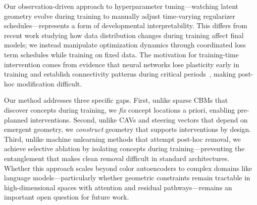 Our observation-driven approach to hyperparameter tuning---watching latent geometry evolve during training to manually adjust time-varying regularizer schedules---represents a form of developmental interpretability. This differs from recent work studying how data distribution changes during training affect final models; we instead manipulate optimization dynamics through coordinated loss term schedules while training on fixed data. The motivation for training-time intervention comes from evidence that neural networks lose plasticity early in training and establish connectivity patterns during critical periods~\citep{AchilleRS17}, making post-hoc modification difficult.

Our method addresses three specific gaps. First, unlike sparse CBMs that discover concepts during training, we \textit{fix} concept locations a priori, enabling pre-planned interventions. Second, unlike CAVs and steering vectors that depend on emergent geometry, we \textit{construct} geometry that supports interventions by design. Third, unlike machine unlearning methods that attempt post-hoc removal, we achieve selective ablation by isolating concepts during training---preventing the entanglement that makes clean removal difficult in standard architectures. Whether this approach scales beyond color autoencoders to complex domains like language models---particularly whether geometric constraints remain tractable in high-dimensional spaces with attention and residual pathways---remains an important open question for future work.
